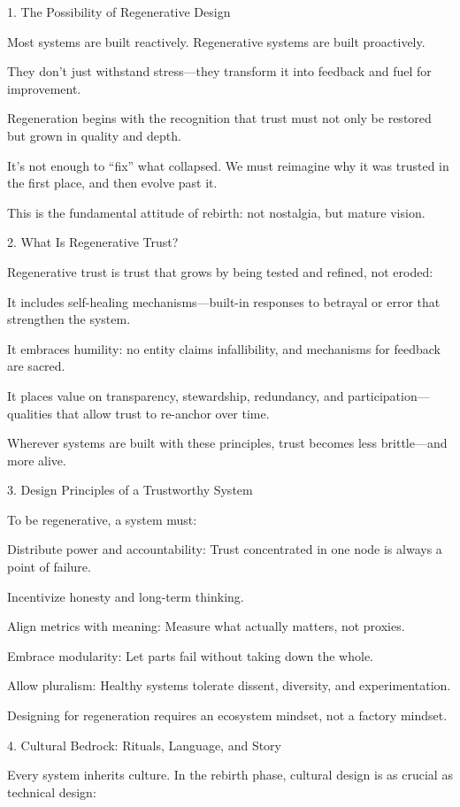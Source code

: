 \documentclass[11pt,oneside]{book}
\begin{document}
1. The Possibility of Regenerative Design


Most systems are built reactively. Regenerative systems are built proactively.

    They don’t just withstand stress—they transform it into feedback and fuel for improvement.

    Regeneration begins with the recognition that trust must not only be restored but grown in quality and depth.

    It’s not enough to “fix” what collapsed. We must reimagine why it was trusted in the first place, and then evolve past it.

This is the fundamental attitude of rebirth: not nostalgia, but mature vision.

2. What Is Regenerative Trust?


Regenerative trust is trust that grows by being tested and refined, not eroded:

    It includes self-healing mechanisms—built-in responses to betrayal or error that strengthen the system.

    It embraces humility: no entity claims infallibility, and mechanisms for feedback are sacred.

    It places value on transparency, stewardship, redundancy, and participation—qualities that allow trust to re-anchor over time.

Wherever systems are built with these principles, trust becomes less brittle—and more alive.

3. Design Principles of a Trustworthy System


To be regenerative, a system must:

    Distribute power and accountability: Trust concentrated in one node is always a point of failure.

    Incentivize honesty and long-term thinking.

    Align metrics with meaning: Measure what actually matters, not proxies.

    Embrace modularity: Let parts fail without taking down the whole.

    Allow pluralism: Healthy systems tolerate dissent, diversity, and experimentation.

Designing for regeneration requires an ecosystem mindset, not a factory mindset.

4. Cultural Bedrock: Rituals, Language, and Story


Every system inherits culture. In the rebirth phase, cultural design is as crucial as technical design:
\end{document}
